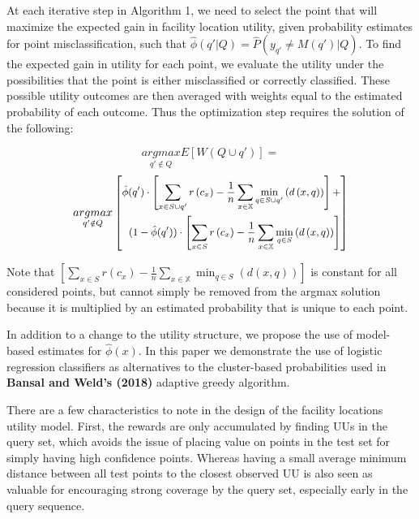 \documentclass[letterpaper]{article} %
\begin{document}
At each iterative step in Algorithm 1, we need to select the point that will maximize the expected gain in facility location utility, given probability estimates for point misclassification, such that  $\hat{\phi}(q' | Q) = \hat{P}(y_{q'} \ne M(q' ) |  Q )$. To find the expected gain in utility for each point, we evaluate the utility under the possibilities that the point is either misclassified or correctly classified. These possible utility outcomes are then averaged with weights equal to the estimated probability of each outcome. Thus the optimization step requires the solution of the following:

$$\underset{q' \notin Q}{argmax} E[W(Q \cup q')] = $$
\begin{equation*}
\small
\underset{q' \notin Q}{argmax} \left[\begin{split}
\hat{\phi}(q') \cdot \left[\sum_{x \in S \cup q'} r \left(c_x\right) - \frac{1}{n} \sum_{x \in \mathbb{X}} \min_{q \in S \cup q'}\left(d\left(x,q\right)\right) \right] + \\ 
(1-\hat{\phi}(q')) \cdot \left[\sum_{x \in S} r \left(c_x\right) - \frac{1}{n} \sum_{x \in \mathbb{X}} \min_{q \in S}\left(d\left(x,q\right)\right)\right]  
\end{split}\right]
\end{equation*}
\normalsize

Note that $\left[\sum_{x \in S} r \left(c_x\right) - \frac{1}{n} \sum_{x \in \mathbb{X}} \min_{q \in S}\left(d\left(x,q\right)\right)\right]$ is constant for all considered points, but cannot simply be removed from the argmax solution because it is multiplied by an estimated probability that is unique to each point. 

In addition to a change to the utility structure, we propose the use of model-based estimates for $\hat{\phi}(x)$. In this paper we demonstrate the use of logistic regression classifiers as alternatives to the cluster-based probabilities used in  \textbf{Bansal and Weld’s (2018)} adaptive greedy algorithm.

There are a few characteristics to note in the design of the facility locations utility model. First, the rewards are only accumulated by finding UUs in the query set, which avoids the issue of placing value on points in the test set for simply having high confidence points. Whereas having a small average minimum distance between all test points to the closest observed UU is also seen as valuable for encouraging strong coverage by the query set, especially early in the query sequence. 
\end{document}
